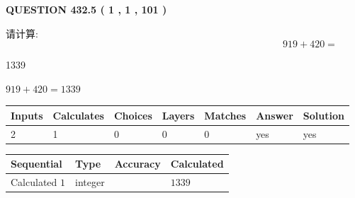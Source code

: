 \documentclass{ctexart}
\begin{document}
   
  
\vspace{0.2in}
  
{\textbf{\Large{QUESTION
432.5 
 ( 1 , 1 , 101 )
}}}
  
  
 
请计算:
\begin{equation}
919 +  %
420 = \nonumber
\end{equation}
 
 
 
\noindent{}
 
 

1339
 
 
\noindent{}
 
 

 
 
 
\noindent{}
 
 

$ %
919 +  %
420=   %
1339$
 
 
\noindent{}
 
 

 
   
   
   
   
\noindent\begin{tabular}{|l|l|l|l|l|l|l|}
 \hline
Inputs & Calculates & Choices & Layers & Matches & Answer & Solution \\ \hline
 2  & 
 1  & 
 0
  & 
 0  & 
 0  & 
  yes & 
  yes 
  \\ \hline
 \end{tabular}
   
   
   
   
\noindent{}
   
   
  
  
\noindent\begin{tabular}{|l|l|l|l|}
\hline
 Sequential & Type & Accuracy & Calculated \\ 
\hline
 
 
  Calculated $  1 $ & integer &  & 
  $ 1339 $ 
 \\  \hline  
 \end{tabular}
   
\end{document}
